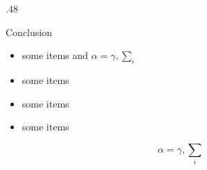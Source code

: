 \documentclass[final,hyperref={pdfpagelabels=false}]{beamer}
\begin{document}
\begin{frame}
\begin{columns}[t]
\begin{column}{.48\linewidth}
        \begin{block}{Conclusion}
          \begin{itemize}
          \item some items and $\alpha=\gamma, \sum_{i}$
          \item some items
          \item some items
          \item some items
          \end{itemize}
          $$\alpha=\gamma, \sum_{i}$$
        \end{block}
        \end{column}
        \end{columns}
    \end{frame}
\end{document}
